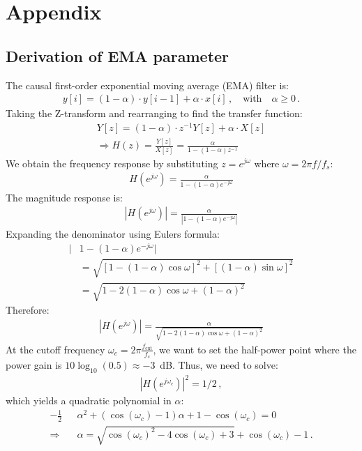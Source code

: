 \documentclass[journal]{IEEEtran}
\begin{document}
\section*{Appendix}

\subsection{Derivation of EMA parameter}\label{apx:ema}
The causal first-order exponential moving average (EMA) filter is:
\begin{align}
y[i] = (1 - \alpha) \cdot y[i-1] + \alpha \cdot x[i]\,, \quad \text{with}\quad \alpha \geq 0\,.
\end{align}
Taking the Z-transform and rearranging to find the transfer function:
\begin{align}
Y[z] = (1 - \alpha) \cdot z^{-1} Y[z] + \alpha \cdot X[z] \\
\Rightarrow H(z) = \frac{Y[z]}{X[z]} = \frac{\alpha}{1 - (1-\alpha)z^{-1}}
\end{align}
We obtain the frequency response by substituting $z = e^{j\omega}$ where $\omega = 2\pi f / f_s$:
\begin{align}
H(e^{j\omega}) = \frac{\alpha}{1 - (1-\alpha)e^{-j\omega}}
\end{align}
The magnitude response is:
\begin{align}
|H(e^{j\omega})| = \frac{\alpha}{|1 - (1-\alpha)e^{-j\omega}|}
\end{align}
Expanding the denominator using Eulers formula:
\begin{align}
|&1 - (1-\alpha)e^{-j\omega}| \\
&= \sqrt{[1 - (1-\alpha)\cos\omega]^2 + [(1-\alpha)\sin\omega]^2} \\
&= \sqrt{1 - 2(1-\alpha)\cos\omega + (1-\alpha)^2}
\end{align}
Therefore:
\begin{align}
|H(e^{j\omega})| = \frac{\alpha}{\sqrt{1 - 2(1-\alpha)\cos\omega + (1-\alpha)^2}}
\end{align}
At the cutoff frequency $\omega_c = 2\pi \frac{f_{\text{cut}}}{f_s}$, we want to set the half-power point where the power gain is $10\log_{10}(0.5) \approx -3$~dB.
Thus, we need to solve:
\begin{align}
|H(e^{j\omega_c})|^2 = 1/2\,,
\end{align}
which yields a quadratic polynomial in $\alpha$:
\begin{align}
-\frac{1}{2} &\alpha^2 + \left(\cos(\omega_c) - 1\right) \alpha + 1 - \cos(\omega_c) = 0\\
\Rightarrow\quad &\alpha = \sqrt{\cos(\omega_c)^2 - 4\cos(\omega_c) + 3} + \cos(\omega_c) - 1 \,.
\end{align}
\end{document}
